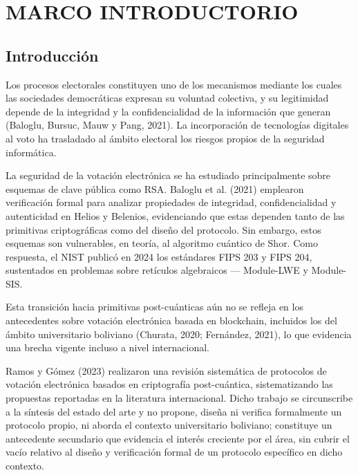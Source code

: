 \chapter{MARCO INTRODUCTORIO}

\section{Introducción}
Los procesos electorales constituyen uno de los mecanismos mediante los cuales las sociedades democráticas expresan su voluntad colectiva, y su legitimidad depende de la integridad y la confidencialidad de la información que generan (Baloglu, Bursuc, Mauw y Pang, 2021). La incorporación de tecnologías digitales al voto ha trasladado al ámbito electoral los riesgos propios de la seguridad informática.

La seguridad de la votación electrónica se ha estudiado principalmente sobre esquemas de clave pública como RSA. Baloglu et al. (2021) emplearon verificación formal para analizar propiedades de integridad, confidencialidad y autenticidad en Helios y Belenios, evidenciando que estas dependen tanto de las primitivas criptográficas como del diseño del protocolo. Sin embargo, estos esquemas son vulnerables, en teoría, al algoritmo cuántico de Shor. Como respuesta, el NIST publicó en 2024 los estándares FIPS 203 y FIPS 204, sustentados en problemas sobre retículos algebraicos --- Module-LWE y Module-SIS.

Esta transición hacia primitivas post-cuánticas aún no se refleja en los antecedentes sobre votación electrónica basada en blockchain, incluidos los del ámbito universitario boliviano (Churata, 2020; Fernández, 2021), lo que evidencia una brecha vigente incluso a nivel internacional.

Ramos y Gómez (2023) realizaron una revisión sistemática de protocolos de votación electrónica basados en criptografía post-cuántica, sistematizando las propuestas reportadas en la literatura internacional. Dicho trabajo se circunscribe a la síntesis del estado del arte y no propone, diseña ni verifica formalmente un protocolo propio, ni aborda el contexto universitario boliviano; constituye un antecedente secundario que evidencia el interés creciente por el área, sin cubrir el vacío relativo al diseño y verificación formal de un protocolo específico en dicho contexto.

